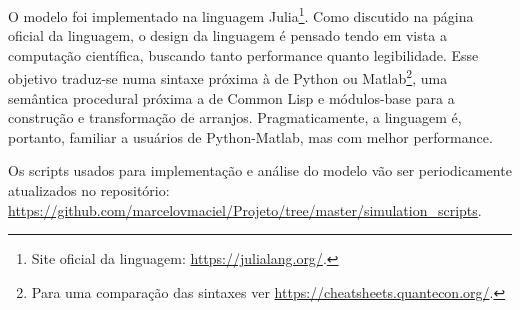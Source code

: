 O modelo foi implementado na linguagem Julia\footnote{Site oficial da linguagem:
\url{https://julialang.org/}.}. Como discutido na página oficial da linguagem, o
design da linguagem é pensado tendo em vista a computação científica, buscando
tanto performance quanto legibilidade. Esse objetivo traduz-se numa sintaxe
próxima à de Python ou Matlab\footnote{Para uma comparação das sintaxes ver
\url{https://cheatsheets.quantecon.org/}.}, uma semântica procedural próxima a
de Common Lisp e módulos-base  para a construção e transformação de
arranjos. Pragmaticamente, a linguagem é, portanto, familiar a usuários de
Python-Matlab, mas com melhor performance.

Os scripts usados para implementação e análise do modelo vão ser periodicamente
atualizados no repositório:
\url{https://github.com/marcelovmaciel/Projeto/tree/master/simulation_scripts}.

% 
